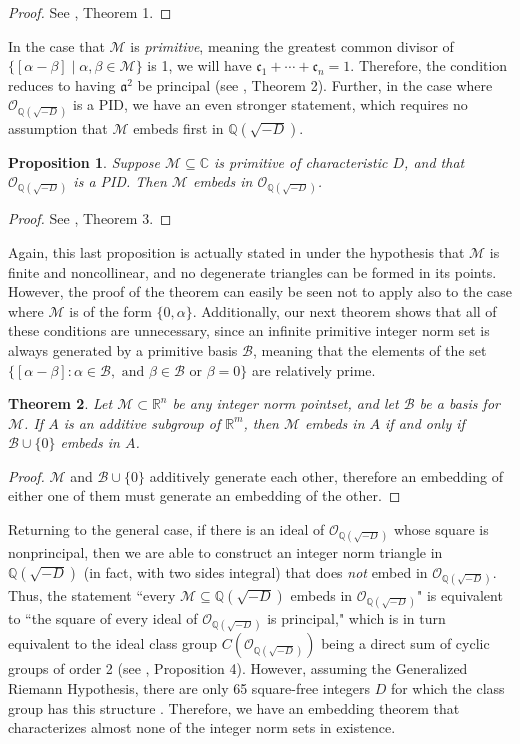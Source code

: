 \documentclass[10pt]{amsart}
\newcommand{\M}{\mathcal{M}}
\newcommand{\B}{\mathcal{B}}
\newcommand{\Q}{\mathbb{Q}}
\newcommand{\R}{\mathbb{R}}
\newcommand{\C}{\mathbb{C}}
\renewcommand{\a}{\mathfrak{a}}
\renewcommand{\c}{\mathfrak{c}}
\newcommand{\thering}{\mathcal{O}_{\Q(\sqrt{-D})}}
\newcommand{\norm}[1]{\left[#1\right]}
\newtheorem{thm}{Theorem}
\newtheorem{prop}[thm]{Proposition}
\begin{document}
\begin{proof}
See \cite{Kn15}, Theorem 1.
\end{proof}

In the case that $\M$ is \emph{primitive}, meaning the greatest common divisor of $\{\norm{\alpha - \beta} \mid \alpha, \beta \in \M\}$ is 1, we will have $\c_1 + \cdots + \c_n = 1$.  Therefore, the condition reduces to having $\a^2$ be principal (see \cite{Kn15}, Theorem 2).  Further, in the case where $\thering$ is a PID, we have an even stronger statement, which requires no assumption that $\M$ embeds first in $\Q(\sqrt{-D})$.

\begin{prop}
\normalfont
Suppose $\M \subseteq \C$ is primitive of characteristic $D$, and that $\thering$ is a PID.  Then $\M$ embeds in $\thering$.
\end{prop}

\begin{proof}
See \cite{Kn15}, Theorem 3.
\end{proof}

Again, this last proposition is actually stated in \cite{Kn15} under the hypothesis that $\M$ is finite and noncollinear, and no degenerate triangles can be formed in its points.  However, the proof of the theorem can easily be seen not to apply also to the case where $\M$ is of the form $\{0,\alpha\}$.  Additionally, our next theorem shows that all of these conditions are unnecessary, since an infinite primitive integer norm set is always generated by a primitive basis $\B$, meaning that the elements of the set $\{\norm{\alpha - \beta} : \alpha \in \B, \text{ and } \beta \in \B \text{ or } \beta = 0\}$ are relatively prime.

\begin{thm}
\normalfont
Let $\M \subset \R^n$ be any integer norm pointset, and let $\B$ be a basis for $\M$.  If $A$ is an additive subgroup of $\R^m$, then $\M$ embeds in $A$ if and only if $\B \cup \{0\}$ embeds in $A$.
\end{thm}

\begin{proof}
$\M$ and $\B \cup \{0\}$ additively generate each other, therefore an embedding of either one of them must generate an embedding of the other.
\end{proof}

Returning to the general case, if there is an ideal of $\thering$ whose square is nonprincipal, then we are able to construct an integer norm triangle in $\Q(\sqrt{-D})$ (in fact, with two sides integral) that does \emph{not} embed in $\thering$.  Thus, the statement ``every $\M \subseteq \Q(\sqrt{-D})$ embeds in $\thering$" is equivalent to ``the square of every ideal of $\thering$ is principal," which is in turn equivalent to the ideal class group $C(\thering)$ being a direct sum of cyclic groups of order 2 (see \cite{Kn15}, Proposition 4).  However, assuming the Generalized Riemann Hypothesis, there are only 65 square-free integers $D$ for which the class group has this structure \cite{Kn15}.  Therefore, we have an embedding theorem that characterizes almost none of the integer norm sets in existence.
\end{document}
